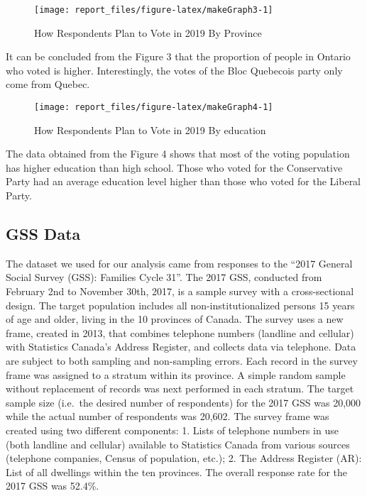 \documentclass[
  12pt,
]{article}
\begin{document}
\begin{figure}
\texttt{[image: report\_files/figure-latex/makeGraph3-1]} \caption{How Respondents Plan to Vote in 2019 By Province}\label{fig:makeGraph3}
\end{figure}

It can be concluded from the Figure 3 that the proportion of people in
Ontario who voted is higher. Interestingly, the votes of the Bloc
Quebecois party only come from Quebec.

\begin{figure}
\texttt{[image: report\_files/figure-latex/makeGraph4-1]} \caption{How Respondents Plan to Vote in 2019 By education}\label{fig:makeGraph4}
\end{figure}

The data obtained from the Figure 4 shows that most of the voting
population has higher education than high school. Those who voted for
the Conservative Party had an average education level higher than those
who voted for the Liberal Party.

\hypertarget{gss-data}{%
\subsection{GSS Data}\label{gss-data}}

The dataset we used for our analysis came from responses to the ``2017
General Social Survey (GSS): Families Cycle 31''. The 2017 GSS,
conducted from February 2nd to November 30th, 2017, is a sample survey
with a cross-sectional design. The target population includes all
non-institutionalized persons 15 years of age and older, living in the
10 provinces of Canada. The survey uses a new frame, created in 2013,
that combines telephone numbers (landline and cellular) with Statistics
Canada's Address Register, and collects data via telephone. Data are
subject to both sampling and non-sampling errors. Each record in the
survey frame was assigned to a stratum within its province. A simple
random sample without replacement of records was next performed in each
stratum. The target sample size (i.e.~the desired number of respondents)
for the 2017 GSS was 20,000 while the actual number of respondents was
20,602. The survey frame was created using two different components: 1.
Lists of telephone numbers in use (both landline and cellular) available
to Statistics Canada from various sources (telephone companies, Census
of population, etc.); 2. The Address Register (AR): List of all
dwellings within the ten provinces. The overall response rate for the
2017 GSS was 52.4\%.
\end{document}
